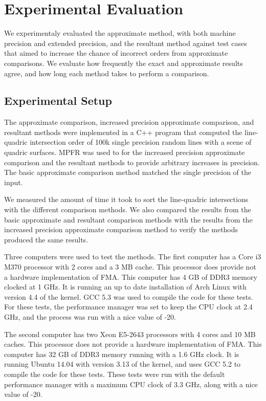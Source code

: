 \documentclass{cccg16}
\begin{document}
\section{Experimental Evaluation}
We experimentaly evaluated the approximate method, with both machine precision and extended precision, 
and the resultant method against test
cases that aimed to increase the chance of incorrect orders from 
approximate comparisons.  We evaluate how
frequently the exact and approximate results agree,  and how long each method takes to perform
a comparison.

\subsection{Experimental Setup}
The approximate comparison, increased precision approximate
comparison, and resultant methods were implemented in a C++ program
that computed the line-quadric intersection order of 100k single
precision random lines with a scene of quadric surfaces.
MPFR\cite{mpfr} was used to for the increased precision approximate
comparison and the resultant methods to provide arbitrary increases in
precision.  The basic approximate comparison method matched the single
precision of the input.

We measured the amount of time it took to sort the line-quadric
intersections with the different comparison methods.  We also compared
the results from the basic approximate and resultant comparison
methods with the results from the increased precision approximate
comparison method to verify the methods produced the same results.

Three computers were used to test the methods.  The first computer has
a Core i3 M370 processor with 2 cores and a 3 MB cache.  This
processor does provide not a hardware implementation of FMA.  This
computer has 4 GB of DDR3 memory clocked at 1 GHz.  It is running an
up to date installation of Arch Linux with version 4.4 of the kernel.
GCC 5.3 was used to compile the code for these tests.  For these
tests, the performance manager was set to keep the CPU clock at 2.4
GHz, and the process was run with a nice value of -20.

The second computer has two Xeon E5-2643 processors with 4 cores and
10 MB caches.  This processor does not provide a hardware
implementation of FMA.  This computer has 32 GB of DDR3 memory running
with a 1.6 GHz clock.  It is running Ubuntu 14.04 with version 3.13 of
the kernel, and uses GCC 5.2 to compile the code for these tests.
These tests were run with the default performance manager with a
maximum CPU clock of 3.3 GHz, along with a nice value of -20.
\end{document}
